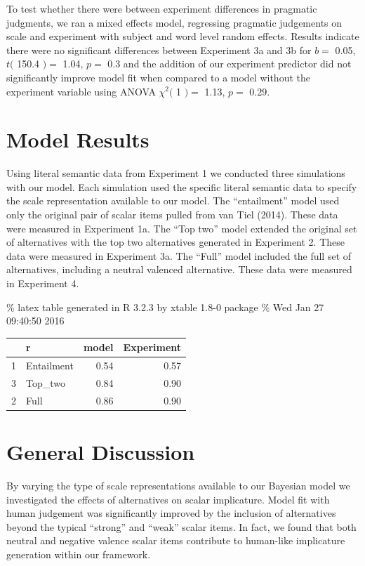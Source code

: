 \documentclass[10pt, letterpaper]{article}
\begin{document}
To test whether there were between experiment differences in pragmatic
judgments, we ran a mixed effects model, regressing pragmatic judgements
on scale and experiment with subject and word level random effects.
Results indicate there were no significant differences between
Experiment 3a and 3b for \(b =\) 0.05, \(t(\) 150.4 \() =\) 1.04,
\(p =\) 0.3 and the addition of our experiment predictor did not
significantly improve model fit when compared to a model without the
experiment variable using ANOVA \(\chi^2(\) 1 \() =\) 1.13, \(p =\)
0.29.

\section{Model Results}\label{model-results}

Using literal semantic data from Experiment 1 we conducted three
simulations with our model. Each simulation used the specific literal
semantic data to specify the scale representation available to our
model. The ``entailment'' model used only the original pair of scalar
items pulled from van Tiel (2014). These data were measured in
Experiment 1a. The ``Top two'' model extended the original set of
alternatives with the top two alternatives generated in Experiment 2.
These data were measured in Experiment 3a. The ``Full'' model included
the full set of alternatives, including a neutral valenced alternative.
These data were measured in Experiment 4.

\% latex table generated in R 3.2.3 by xtable 1.8-0 package \% Wed Jan
27 09:40:50 2016

\begin{table}[ht]
\centering
\begin{tabular}{rlrr}
  \hline
 & r & model & Experiment \\ 
  \hline
1 & Entailment & 0.54 & 0.57 \\ 
  3 & Top\_two & 0.84 & 0.90 \\ 
  2 & Full & 0.86 & 0.90 \\ 
   \hline
\end{tabular}
\end{table}

\section{General Discussion}\label{general-discussion}

By varying the type of scale representations available to our Bayesian
model we investigated the effects of alternatives on scalar implicature.
Model fit with human judgement was significantly improved by the
inclusion of alternatives beyond the typical ``strong'' and ``weak''
scalar items. In fact, we found that both neutral and negative valence
scalar items contribute to human-like implicature generation within our
framework.
\end{document}
